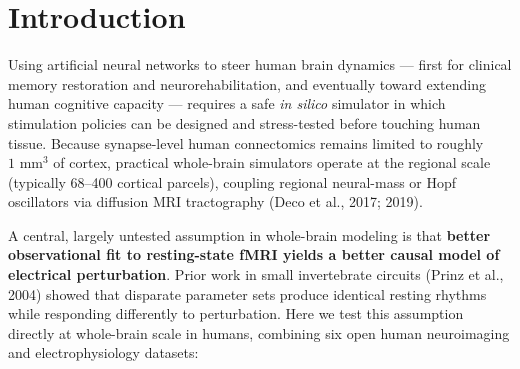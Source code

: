 \documentclass[11pt,a4paper]{article}
\begin{document}
\begin{abstract}
\end{abstract}
\section{Introduction}
Using artificial neural networks to steer human brain dynamics --- first for clinical memory restoration and neurorehabilitation, and eventually toward extending human cognitive capacity --- requires a safe \emph{in silico} simulator in which stimulation policies can be designed and stress-tested before touching human tissue. Because synapse-level human connectomics remains limited to roughly $1\text{ mm}^3$ of cortex, practical whole-brain simulators operate at the regional scale (typically 68--400 cortical parcels), coupling regional neural-mass or Hopf oscillators via diffusion MRI tractography (Deco et al., 2017; 2019).

A central, largely untested assumption in whole-brain modeling is that \textbf{better observational fit to resting-state fMRI yields a better causal model of electrical perturbation}. Prior work in small invertebrate circuits (Prinz et al., 2004) showed that disparate parameter sets produce identical resting rhythms while responding differently to perturbation. Here we test this assumption directly at whole-brain scale in humans, combining six open human neuroimaging and electrophysiology datasets:
\end{document}
